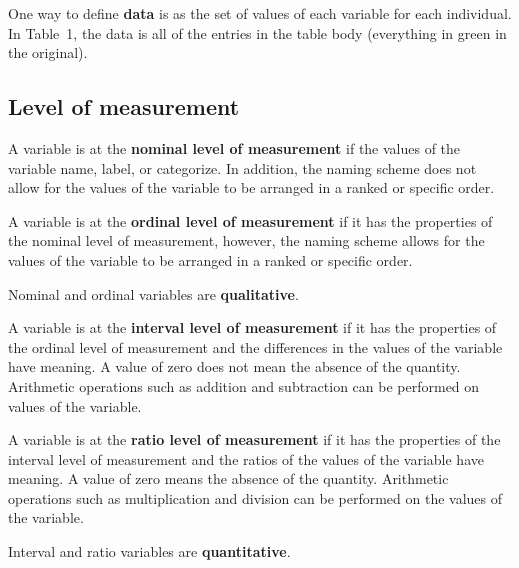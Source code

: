 \documentclass{ximera}
\begin{document}
\begin{definition}
One way to define \textbf{data} is as the set of values of each variable for each individual. In Table~1, the data is all of the entries in the table body (everything in green in the original).
\end{definition}

\subsection*{Level of measurement}

\begin{definition}
A variable is at the \textbf{nominal level of measurement} if the values of the variable name, label, or categorize. In addition, the naming scheme does not allow for the values of the variable to be arranged in a ranked or specific order.

A variable is at the \textbf{ordinal level of measurement} if it has the properties of the nominal level of measurement, however, the naming scheme allows for the values of the variable to be arranged in a ranked or specific order.
\end{definition}

Nominal and ordinal variables are \textbf{qualitative}.

\begin{definition}
A variable is at the \textbf{interval level of measurement} if it has the properties of the ordinal level of measurement and the differences in the values of the variable have meaning. A value of zero does not mean the absence of the quantity. Arithmetic operations such as addition and subtraction can be performed on values of the variable.

A variable is at the \textbf{ratio level of measurement} if it has the properties of the interval level of measurement and the ratios of the values of the variable have meaning. A value of zero means the absence of the quantity. Arithmetic operations such as multiplication and division can be performed on the values of the variable.
\end{definition}

Interval and ratio variables are \textbf{quantitative}.
\end{document}
